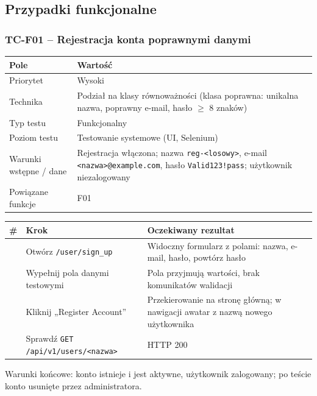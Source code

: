 \subsection{Przypadki funkcjonalne}
\subsubsection{TC-F01 – Rejestracja konta poprawnymi danymi}
{\small
\par\smallskip\noindent\begin{tabular}{>{\raggedright\arraybackslash}p{}>{\raggedright\arraybackslash}p{}}
\toprule
\textbf{Pole} & \textbf{Wartość} \\
\midrule
Priorytet & Wysoki \\
Technika & Podział na klasy równoważności (klasa poprawna: unikalna nazwa, poprawny e-mail, hasło $\geq$ 8 znaków) \\
Typ testu & Funkcjonalny \\
Poziom testu & Testowanie systemowe (UI, Selenium) \\
Warunki wstępne / dane & Rejestracja włączona; nazwa \texttt{reg-<losowy>}, e-mail \texttt{<nazwa>@example.com}, hasło \texttt{Valid123!pass}; użytkownik niezalogowany \\
Powiązane funkcje & F01 \\
\bottomrule
\end{tabular}\par\smallskip
}
{\small
\par\smallskip\noindent\begin{tabular}{>{\raggedright\arraybackslash}p{}>{\raggedright\arraybackslash}p{}>{\raggedright\arraybackslash}p{}}
\toprule
\textbf{\#} & \textbf{Krok} & \textbf{Oczekiwany rezultat} \\
\midrule
1 & Otwórz \texttt{/\allowbreak{}user/\allowbreak{}sign\_\allowbreak{}up} & Widoczny formularz z polami: nazwa, e-mail, hasło, powtórz hasło \\
2 & Wypełnij pola danymi testowymi & Pola przyjmują wartości, brak komunikatów walidacji \\
3 & Kliknij „Register Account” & Przekierowanie na stronę główną; w nawigacji awatar z nazwą nowego użytkownika \\
4 & Sprawdź \texttt{GET /\allowbreak{}api/\allowbreak{}v1/\allowbreak{}users/\allowbreak{}<nazwa>} & HTTP 200 \\
\bottomrule
\end{tabular}\par\smallskip
}
Warunki końcowe: konto istnieje i jest aktywne, użytkownik zalogowany; po teście konto usunięte przez administratora.

